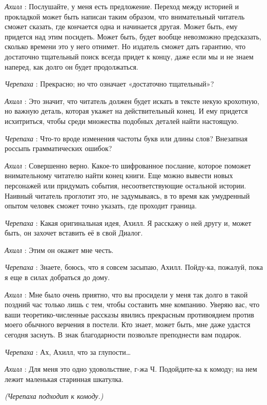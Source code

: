 \documentclass[../main.tex]{subfiles}
\begin{document}
\begin{dialogue}
\emph{Ахилл} : Послушайте, у меня есть предложение. Переход между историей и прокладкой может быть написан таким образом, что внимательный читатель сможет сказать, где кончается одна и начинается другая. Может быть, ему придется над этим посидеть. Может быть, будет вообще невозможно предсказать, сколько времени это у него отнимет. Но издатель сможет дать гарантию, что достаточно тщательный поиск всегда придет к концу, даже если мы и не знаем наперед, как долго он будет продолжаться.

\emph{Черепаха} : Прекрасно; но что означает «достаточно тщательный»?

\emph{Ахилл} : Это значит, что читатель должен будет искать в тексте некую крохотную, но важную деталь, которая укажет на действительный конец. И ему придется исхитриться, чтобы среди множества подобных деталей найти настоящую.

\emph{Черепаха} : Что-то вроде изменения частоты букв или длины слов? Внезапная россыпь грамматических ошибок?

\emph{Ахилл} : Совершенно верно. Какое-то шифрованное послание, которое поможет внимательному читателю найти конец книги. Еще можно вывести новых персонажей или придумать события, несоответствующие остальной истории. Наивный читатель проглотит это, не задумываясь, в то время как умудренный опытом человек сможет точно указать, где проходит граница.

\emph{Черепаха} : Какая оригинальная идея, Ахилл. Я расскажу о ней другу и, может быть, он захочет вставить её в свой Диалог.

\emph{Ахилл} : Этим он окажет мне честь.

\emph{Черепаха} : Знаете, боюсь, что я совсем засыпаю, Ахилл. Пойду-ка, пожалуй, пока я еще в силах добраться до дому.

\emph{Ахилл} : Мне было очень приятно, что вы просидели у меня так долго в такой поздний час только лишь с тем, чтобы составить мне компанию. Уверяю вас, что ваши теоретико-численные рассказы явились прекрасным противоядием против моего обычного верчения в постели. Кто знает, может быть, мне даже удастся сегодня заснуть. В знак благодарности позвольте преподнести вам подарок.

\emph{Черепаха} : Ах, Ахилл, что за глупости\ldots{}

\emph{Ахилл} : Для меня это одно удовольствие, г-жа Ч. Подойдите-ка к комоду; на нем лежит маленькая старинная шкатулка.

\emph{(Черепаха подходит к комоду.)}


\end{dialogue}
\end{document}
